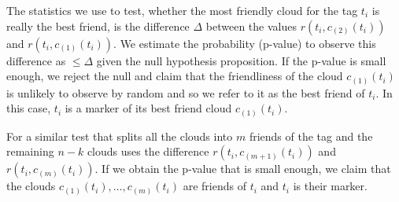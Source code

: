 \documentclass{llncs}
\begin{document}
The statistics we use to test, whether the most friendly cloud for the tag $t_i$ is really the best friend, is the difference $\Delta$ between the values $r(t_i,c_{(2)}(t_i))$ and $r(t_i,c_{(1)}(t_i))$. We estimate the probability (p-value) to observe this difference as $\leq \Delta$ given the null hypothesis proposition. If the p-value is small enough, we reject the null and claim that the friendliness of the cloud $c_{(1)}(t_i)$ is unlikely to observe by random and so we refer to it as the best friend of $t_i$. In this case, $t_i$ is a marker of its best friend cloud $c_{(1)}(t_i)$.

For a similar test that splits all the clouds into $m$ friends of the tag and the remaining $n-k$ clouds uses the difference  $r(t_i,c_{(m+1)}(t_i))$ and $r(t_i,c_{(m)}(t_i))$. If we obtain the p-value that is small enough, we claim that the clouds $c_{(1)}(t_i), \dots, c_{(m)}(t_i)$ are friends of $t_i$ and $t_i$ is their marker.





\end{document}
